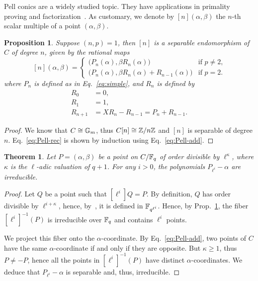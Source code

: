\documentclass{sig-alternate}
\newtheorem{theorem}[definition]{Theorem}
\newtheorem{proposition}[definition]{Proposition}
\begin{document}
Pell conics are a widely studied topic. They have applications in
primality proving and
factorization~\cite{lemmermeyer03,hambleton12}. As customary, we
denote by $[n](\alpha,\beta)$ the $n$-th scalar multiple of a point
$(\alpha,\beta)$.

\begin{proposition}
  \label{th:T2-divpol}
  Suppose $(n,p)=1$, then $[n]$ is a separable endomorphism of $C$ of
  degree $n$, given by the rational maps
  \begin{equation}
    \label{eq:Pell-rec}
    [n](\alpha,\beta) = 
    \begin{cases}
      \bigr(P_n(\alpha), \beta R_n(\alpha)\bigl) & \text{if $p\ne2$,}\\
      \bigr(P_n(\alpha), \beta R_n(\alpha) + R_{n-1}(\alpha)\bigl) & \text{if $p=2$.}      
    \end{cases}
  \end{equation}
  where $P_n$ is defined as in Eq.~\eqref{eq:simple}, and $R_n$ is
  defined by
  \begin{equation}
    \label{eq:fibonacci}
    \begin{aligned}
      R_0 &= 0,\\
      R_1 &= 1,\\
      R_{n+1} &= XR_{n} - R_{n-1} = P_n + R_{n-1}.
    \end{aligned}
  \end{equation}
\end{proposition}
\begin{proof}
  We know that $C\cong\mathbb{G}_m$, thus $C[n]\cong\mathbb{Z}/n\mathbb{Z}$ and $[n]$
  is separable of degree $n$. Eq.~\eqref{eq:Pell-rec} is shown by
  induction using Eq.~\eqref{eq:Pell-add}.
\end{proof}

\begin{theorem}
  \label{th:T2-irred}
  Let $P=(\alpha,\beta)$ be a point on $C/\mathbb{F}_q$ of order
  divisible by $\ell^\kappa$, where $\kappa$ is the $\ell$-adic
  valuation of $q+1$.  For any $i>0$, the polynomials
  $P_{\ell^i}-\alpha$ are irreducible.
\end{theorem}
\begin{proof}
  Let $Q$ be a point such that $[\ell^i]Q=P$. By definition, $Q$ has
  order divisible by $\ell^{i+\kappa}$, hence,
  by~\cite[Th.~VI.9.1]{lang}, it is defined in
  $\mathbb{F}_{q^{\ell^i}}$. Hence, by Prop.~\ref{th:T2-divpol}, the fiber
  $[\ell^i]^{-1}(P)$ is irreducible over $\mathbb{F}_q$ and contains $\ell^i$
  points.

  We project this fiber onto the $\alpha$-coordinate. By
  Eq.~\eqref{eq:Pell-add}, two points of $C$ have the same
  $\alpha$-coordinate if and only if they are opposite. But
  $\kappa\ge1$, thus $P\ne-P$, hence all the points in
  $[\ell^i]^{-1}(P)$ have distinct $\alpha$-coordinates. We deduce
  that $P_{\ell^i}-\alpha$ is separable and, thus, irreducible.
\end{proof}
\end{document}
